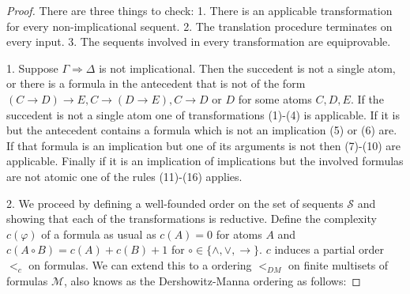 \documentclass[a4paper,12pt]{article}
\theoremstyle{definition}
\theoremstyle{definition}
\theoremstyle{definition}
\theoremstyle{definition}
\theoremstyle{definition}
\theoremstyle{definition}
\begin{document}
	\begin{proof}[Proof]
		
		There are three things to check: 1. There is an applicable transformation for every non-implicational sequent. 2. The translation procedure terminates on every input. 3. The sequents involved in every transformation are equiprovable.
		
		1. Suppose $\Gamma\Rightarrow\Delta$ is not implicational. Then the succedent is not a single atom, or there is a formula in the antecedent that is not of the form $(C\to D)\to E, C\to (D\to E), C\to D$ or $D$ for some atoms $C, D, E$. If the succedent is not a single atom one of transformations (1)-(4) is applicable. If it is but the antecedent contains a formula which is not an implication (5) or (6) are. If that formula is an implication but one of its arguments is not then (7)-(10) are applicable. Finally if it is an implication of implications but the involved formulas are not atomic one of the rules (11)-(16) applies.

		2. We proceed by defining a well-founded order on the set of sequents $\mathcal S$ and showing that each of the transformations is reductive. Define the complexity $c(\varphi)$ of a formula as usual as $c(A) = 0$ for atoms $A$ and $c(A\circ B) = c(A) + c(B) + 1$ for $\circ\in\{\wedge,\vee,\to\}$. $c$ induces a partial order $<_c$ on formulas. We can extend this to a ordering $<_{DM}$ on finite multisets of formulas $\mathcal M$, also knows as the Dershowitz-Manna ordering as follows:
		

\end{proof}
\end{document}
